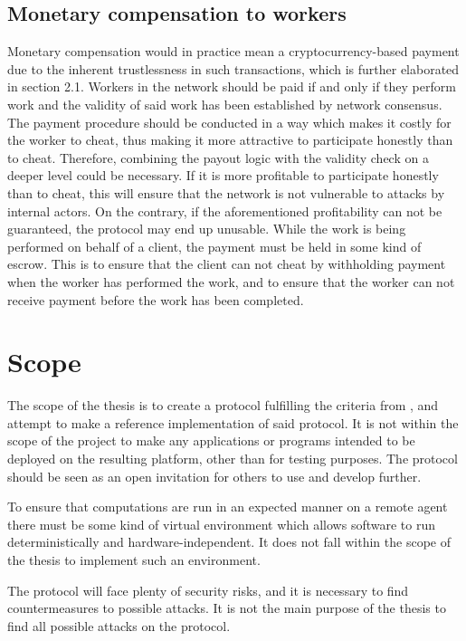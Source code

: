 \subsection{Monetary compensation to workers}
\label{sec:prob:compensation}
Monetary compensation would in practice mean a cryptocurrency-based payment due to the inherent trustlessness in such transactions, which is further elaborated in section 2.1. Workers in the network should be paid if and only if they perform work and the validity of said work has been established by network consensus. The payment procedure should be conducted in a way which makes it costly for the worker to cheat, thus making it more attractive to participate honestly than to cheat. Therefore, combining the payout logic with the validity check on a deeper level could be necessary. If it is more profitable to participate honestly than to cheat, this will ensure that the network is not vulnerable to attacks by internal actors. On the contrary, if the aforementioned profitability can not be guaranteed, the protocol may end up unusable. While the work is being performed on behalf of a client, the payment must be held in some kind of escrow. This is to ensure that the client can not cheat by withholding payment when the worker has performed the work, and to ensure that the worker can not receive payment before the work has been completed.

\section{Scope}
The scope of the thesis is to create a protocol fulfilling the criteria from , and attempt to make a reference implementation of said protocol. It is not within the scope of the project to make any applications or programs intended to be deployed on the resulting platform, other than for testing purposes. The protocol should be seen as an open invitation for others to use and develop further.

To ensure that computations are run in an expected manner on a remote agent there must be some kind of virtual environment which allows software to run deterministically and hardware-independent. It does not fall within the scope of the thesis to implement such an environment.

The protocol will face plenty of security risks, and it is necessary to find countermeasures to possible attacks. It is not the main purpose of the thesis to find all possible attacks on the protocol.